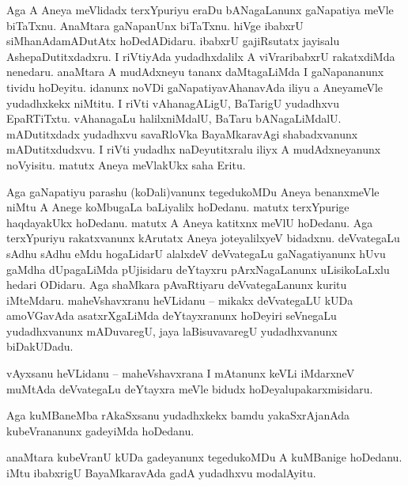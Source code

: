 \documentclass{article}
\begin{document}
\begin{mng}%
Aga A Aneya meVlidadx terxYpuriyu eraDu bANagaLanunx gaNapatiya meVle biTaTxnu. AnaMtara gaNapanUnx 
biTaTxnu. hiVge ibabxrU siMhanAdamADutAtx hoDedADidaru. ibabxrU gajiRsutatx jayisalu 
AshepaDutitxdadxru. I riVtiyAda yudadhxdalilx A viVraribabxrU rakatxdiMda nenedaru. anaMtara A 
mudAdxneyu tananx daMtagaLiMda I gaNapananunx tividu hoDeyitu. idanunx noVDi gaNapatiyavAhanavAda 
iliyu a AneyameVle yudadhxkekx niMtitu. I riVti vAhanagALigU, BaTarigU yudadhxvu EpaRTiTxtu. 
vAhanagaLu halilxniMdalU, BaTaru bANagaLiMdalU. mADutitxdadx yudadhxvu savaRloVka BayaMkaravAgi 
shabadxvanunx mADutitxdudxvu. I riVti yudadhx naDeyutitxralu iliyx A mudAdxneyanunx noVyisitu. 
matutx Aneya meVlakUkx saha Eritu.	
\end{mng}

\begin{mng}%
Aga gaNapatiyu parashu (koDali)vanunx tegedukoMDu Aneya benanxmeVle niMtu A Anege koMbugaLa 
baLiyalilx hoDedanu. matutx terxYpurige haqdayakUkx hoDedanu. matutx A Aneya katitxnx meVlU 
hoDedanu. Aga terxYpuriyu rakatxvanunx kArutatx Aneya joteyalilxyeV bidadxnu. deVvategaLu sAdhu 
sAdhu eMdu hogaLidarU alalxdeV deVvategaLu gaNagatiyanunx hUvu gaMdha dUpagaLiMda pUjisidaru 
deYtayxru pArxNagaLanunx uLisikoLaLxlu hedari ODidaru. Aga shaMkara pAvaRtiyaru deVvategaLanunx 
kuritu iMteMdaru. maheVshavxranu heVLidanu -- mikakx deVvategaLU kUDa amoVGavAda asatxrXgaLiMda 
deYtayxranunx hoDeyiri seVnegaLu yudadhxvanunx mADuvaregU, jaya laBisuvavaregU yudadhxvanunx 
biDakUDadu.
\end{mng}


\begin{mng}%
vAyxsanu heVLidanu -- maheVshavxrana I mAtanunx keVLi iMdarxneV muMtAda deVvategaLu deYtayxra meVle 
bidudx hoDeyalupakarxmisidaru.
\end{mng}

\begin{mng}%
Aga kuMBaneMba rAkaSxsanu yudadhxkekx bamdu yakaSxrAjanAda kubeVrananunx gadeyiMda hoDedanu.
\end{mng}

\begin{mng}%
anaMtara kubeVranU kUDa gadeyanunx tegedukoMDu A kuMBanige hoDedanu. iMtu ibabxrigU BayaMkaravAda 
gadA yudadhxvu modalAyitu.
\end{mng}
\end{document}
